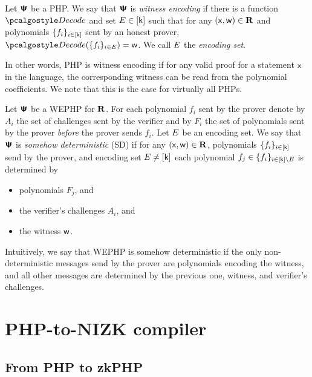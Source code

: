 \documentclass[runningheads,11pt]{llncs}
\begin{document}
\begin{definition}
  \label{def:wephp}
  Let $\bm{\mathsf{\Psi}}$ be a PHP.  We say that $\bm{\mathsf{\Psi}}$ is \emph{witness encoding} if there is
  a function $\decode$ and set $E \in [\mathsf{k}]$ such that for any
  $(\mathsf{x}, \mathsf{w}) \in \mathbf{R}$ and polynomials $\{f_i\}_{i \in [\mathsf{k}]}$ sent by an
  honest prover, $\decode(\smallset{f_i}_{i \in \encset}) = \wit$. We call $E$ the
  \emph{encoding set}.
\end{definition}
In other words, PHP is witness encoding if for any valid proof for a statement
$\mathsf{x}$ in the language, the corresponding witness can be read from the
polynomial coefficients. We note that this is the case for virtually all
PHPs. 

\begin{definition}
  \label{def:sdwephp}
  Let $\bm{\mathsf{\Psi}}$ be a WEPHP for $\mathbf{R}$. For each polynomial $f_i$ sent by the prover
  denote by $A_i$ the set of challenges sent by the verifier and by $F_i$ the
  set of polynomials sent by the prover \emph{before} the prover sends
  $f_i$. Let $E$ be an encoding set. We say that $\bm{\mathsf{\Psi}}$ is \emph{somehow
    deterministic} (SD) if for any $(\mathsf{x}, \mathsf{w}) \in \mathbf{R}$, polynomials
  $\{f_i\}_{i \in [\mathsf{k}]}$ send by the prover, and encoding set
  $E \neq [\mathsf{k}]$ each polynomial
  $f_j \in \{f_i\}_{i \in [\mathsf{k}] \setminus E}$ is determined by
  \begin{itemize}
    \item polynomials $F_j$, and
    \item the verifier's challenges $A_i$, and
    \item the witness $\mathsf{w}$.
  \end{itemize}
\end{definition}
Intuitively, we say that WEPHP is somehow deterministic if the only
non-deterministic messages send by the prover are polynomials encoding the
witness, and all other messages are determined by the previous one, witness, and
verifier's challenges.

\section{PHP-to-NIZK compiler}

\subsection{From PHP to zkPHP}
\end{document}
